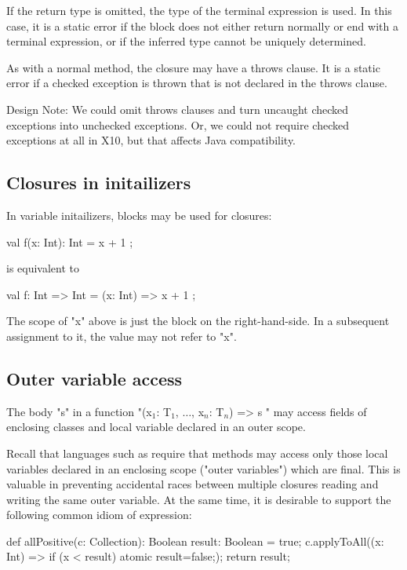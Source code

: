 If the return type is omitted, the type of the terminal
expression is used. In
this case, it is a static error if the block does not either return
normally or end with a terminal expression, or if the inferred type
cannot be uniquely determined.

As with a normal method, the closure may have a throws clause. It is a
static error if a checked exception is thrown that is not declared in
the throws clause.

Design Note: We could omit throws clauses and turn uncaught checked
exceptions into unchecked exceptions. Or, we could not require checked
exceptions at all in X10, but that affects Java compatibility.


\subsection{Closures in initailizers}

In variable initailizers, blocks may be used for closures:

\begin{xten}
val f(x: Int): Int = { x + 1 };
\end{xten}

is equivalent to

\begin{xten}
val f: Int => Int = (x: Int) => { x + 1 };
\end{xten}

The scope of \xcd"x" above is just the block on the
right-hand-side. In a
subsequent assignment to it, the value may not refer to \xcd"x".

\subsection{ Outer variable access}

The body \xcd"s" in a function
\xcdmath"(x$_1$: T$_1$, $\dots$, x$_n$: T$_n$) => { s }"
may access fields
of enclosing classes and local variable declared in an outer scope.

Recall that languages such as \java{} require that methods may
access only those local variables declared in an enclosing scope
("outer variables") which are final. This is valuable in
preventing accidental races between multiple closures reading
and writing the same outer variable. At the same time, it is
desirable to support the following common idiom of expression:

\begin{xten}
def allPositive(c: Collection): Boolean {
  result: Boolean = true;
  c.applyToAll((x: Int) => { if (x < result) atomic {result=false;}});
  return result;
}
\end{xten}

